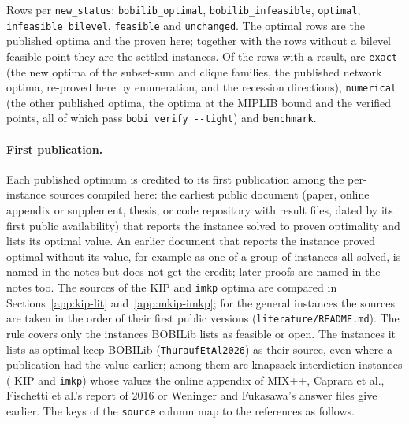 \noindent Rows per \texttt{new\_status}: \NumBobiOptimal{} \texttt{bobilib\_optimal},
\NumBobiInfeasible{} \texttt{bobilib\_infeasible}, \NumOptimalNow{} \texttt{optimal},
\NumNoFeasible{} \texttt{infeasible\_bilevel}, \NumFirstPoint{} \texttt{feasible}
and \NumUnchanged{} \texttt{unchanged}. The \NumOptimalNow{} optimal rows are the
\NumLitOptimal{} published optima and the \NumNewOptimal{} proven here; together
with the \NumNoFeasible{} rows without a bilevel feasible point they are the
\NumSettled{} settled instances. Of the \NumClassRows{} rows with a result,
\NumClassExact{} are \texttt{exact} (the \NumClassExactNew{} new optima of the
subset-sum and clique families, the \NumClassExactLit{} published network optima,
re-proved here by enumeration, and the \NumNoFeasible{} recession
directions), \NumClassNumerical{} \texttt{numerical} (the other \NumClassNumericalLit{}
published optima, the \NumNewHpr{} optima at the MIPLIB bound and the
\NumFirstPoint{} verified points, all of which pass \texttt{bobi verify -{}-tight})
and \NumClassBenchmark{} \texttt{benchmark}.

\paragraph{First publication.}\label{app:first-pub} Each published optimum is
credited to its first publication among the per-instance sources compiled
here: the earliest public document (paper, online appendix or supplement,
thesis, or code repository with result files, dated by its first public
availability) that reports the instance solved to proven optimality and lists
its optimal value. An earlier document that reports the instance proved
optimal without its value, for example as one of a group of instances all
solved, is named in the notes but does not get the credit; later proofs are
named in the notes too. The sources of the KIP and \texttt{imkp} optima are
compared in Sections~\ref{app:kip-lit}
and~\ref{app:mkip-imkp}; for the general instances the sources are taken in the
order of their first public versions (\texttt{literature/README.md}). The rule
covers only the instances BOBILib lists as feasible or open. The
\NumBobiOptimal{} instances it lists as optimal keep BOBILib
(\texttt{ThuraufEtAl2026}) as their source, even where a publication had the
value earlier; among them are \NumBobiOptKnapsack{} knapsack interdiction
instances (\NumBobiOptKip{} KIP and \NumBobiOptImkp{} \texttt{imkp}) whose values
the online appendix of MIX++, Caprara et al., Fischetti et al.'s report of 2016
or Weninger and Fukasawa's answer files give
earlier.\cite{fischetti2016appendix,caprara2016bilevel,fischetti2016monotonicity,weninger_bkpsolver}
The keys of the \texttt{source} column map to the references as follows.

